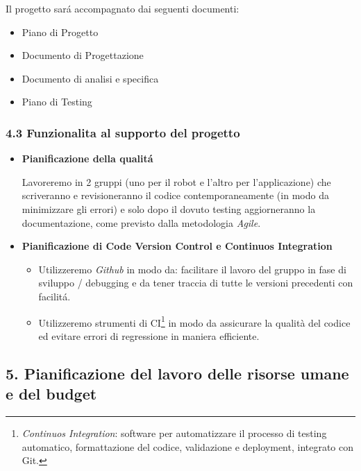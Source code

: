 \documentclass[]{article}
\providecommand{\tightlist}{%
  \setlength{\itemsep}{0pt}\setlength{\parskip}{0pt}}
\begin{document}
Il progetto sará accompagnato dai seguenti documenti:

\begin{itemize}
\tightlist
\item
  Piano di Progetto
\item
  Documento di Progettazione
\item
  Documento di analisi e specifica
\item
  Piano di Testing
\end{itemize}

\hypertarget{funzionalita-al-supporto-del-progetto}{%
\subsubsection{4.3 Funzionalita al supporto del
progetto}\label{funzionalita-al-supporto-del-progetto}}

\begin{itemize}
\item
  \textbf{Pianificazione della qualitá}

  Lavoreremo in 2 gruppi (uno per il robot e l'altro per l'applicazione)
  che scriveranno e revisioneranno il codice contemporaneamente (in modo
  da minimizzare gli errori) e solo dopo il dovuto testing aggiorneranno
  la documentazione, come previsto dalla metodologia \emph{Agile}.
\item
  \textbf{Pianificazione di Code Version Control e Continuos
  Integration}

  \begin{itemize}
  \item
    Utilizzeremo \emph{Github} in modo da: facilitare il lavoro del
    gruppo in fase di sviluppo / debugging e da tener traccia di tutte
    le versioni precedenti con facilitá.
  \item
    Utilizzeremo strumenti di CI\footnote{\emph{Continuos Integration}:
      software per automatizzare il processo di testing automatico,
      formattazione del codice, validazione e deployment, integrato con
      Git.} in modo da assicurare la qualità del codice ed evitare
    errori di regressione in maniera efficiente.
  \end{itemize}
\end{itemize}

\hypertarget{pianificazione-del-lavoro-delle-risorse-umane-e-del-budget}{%
\subsection{5. Pianificazione del lavoro delle risorse umane e del
budget}\label{pianificazione-del-lavoro-delle-risorse-umane-e-del-budget}}
\end{document}
